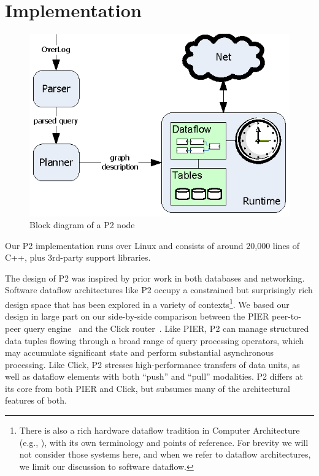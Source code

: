 \documentclass{sig-alt-full}
\def\Sys{P2\xspace}
\begin{document}
\section{Implementation}
\label{sec:impl}

\begin{figure}[t]
\centerline{\includegraphics{Architecture}}
\caption{Block diagram of a \Sys node}
\label{fig:arch}
\end{figure}

Our \Sys implementation runs over Linux and consists of around 20,000
lines of C++, plus 3rd-party support libraries.  

The design of \Sys was inspired by prior work in both databases and
networking.  Software dataflow architectures like \Sys occupy a
constrained but surprisingly rich design space that has been explored
in a variety of contexts\footnote{There is also a rich hardware dataflow
tradition in Computer Architecture 
(e.g., \cite{monsoon,dataflowarch}), with its own terminology and points
of reference. For brevity we will not consider those systems here, and
when we refer to dataflow architectures, we limit our
discussion to software dataflow.}.  We based our design in large part
on our side-by-side 
comparison between the PIER peer-to-peer query engine~\cite{pier-cidr}
and the Click router~\cite{click-tocs}. Like PIER, \Sys can manage
structured data tuples flowing through a 
broad range of query processing operators, which may accumulate
significant state and perform substantial asynchronous processing.
Like Click, \Sys stresses high-performance transfers of
data units, as well as dataflow elements with both
``push'' and ``pull'' modalities.  \Sys differs at its core from both
PIER and Click, but subsumes many of the architectural features of
both. 
\end{document}
